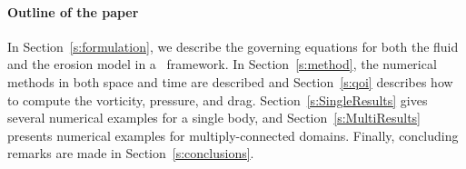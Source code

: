 \documentclass[preprint, 10pt]{elsarticle}
\begin{document}
\paragraph{Outline of the paper} In Section~\ref{s:formulation}, we
describe the governing equations for both the fluid and the erosion
model in a \thL~framework.  In Section~\ref{s:method}, the numerical
methods in both space and time are described and Section~\ref{s:qoi}
describes how to compute the vorticity, pressure, and drag.
Section~\ref{s:SingleResults} gives several numerical examples for a
single body, and Section~\ref{s:MultiResults} presents numerical
examples for multiply-connected domains.  Finally, concluding remarks
are made in Section~\ref{s:conclusions}.

\end{document}
